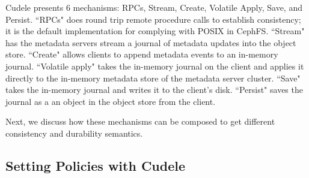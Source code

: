 Cudele presents 6 mechanisms: RPCs, Stream, Create, Volatile Apply, Save, and
Persist. ``RPCs" does round trip remote procedure calls to establish
consistency; it is the default implementation for complying with POSIX in
CephFS. ``Stream" has the metadata servers stream a journal of metadata updates
into the object store. ``Create" allows clients to append metadata events to an
in-memory journal. ``Volatile apply" takes the in-memory journal on the client
and applies it directly to the in-memory metadata store of the metadata server
cluster. ``Save" takes the in-memory journal and writes it to the client's
disk. ``Persist" saves the journal as a an object in the object store from the
client.

Next, we discuss how these mechanisms can be composed to get different
consistency and durability semantics. 


\subsection{Setting Policies with Cudele}
\label{sec:setting-policies-with-cudele}

